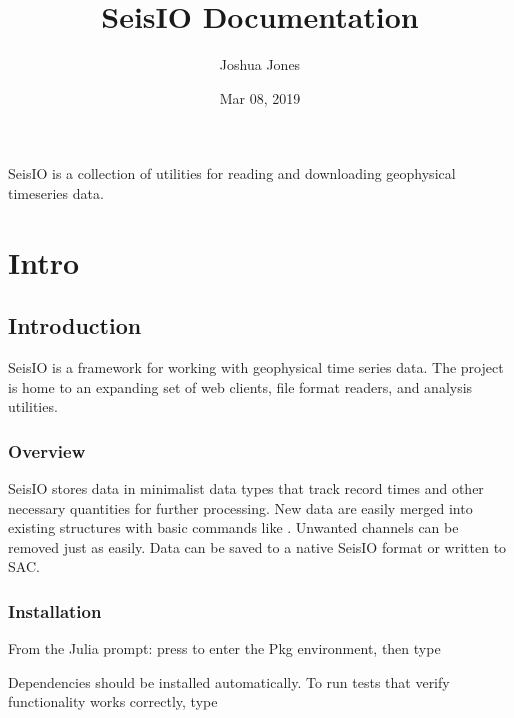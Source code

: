 \documentclass[letterpaper,11pt,english]{sphinxmanual}
\title{SeisIO Documentation}
\date{Mar 08, 2019}
\author{Joshua Jones}
\begin{document}
\pagestyle{empty}
\sphinxmaketitle
\pagestyle{plain}
\sphinxtableofcontents
\pagestyle{normal}
\label{\detokenize{index::doc}}


SeisIO is a collection of utilities for reading and downloading geophysical timeseries data.


\chapter{Intro}
\label{\detokenize{index:intro}}

\section{Introduction}
\label{\detokenize{src/intro:introduction}}\label{\detokenize{src/intro::doc}}
SeisIO is a framework for working with geophysical time series data. The project is home to an expanding set of web clients, file format readers, and analysis utilities.


\subsection{Overview}
\label{\detokenize{src/intro:overview}}
SeisIO stores data in minimalist data types that track record times and other necessary quantities for further processing. New data are easily merged into existing structures with basic commands like \sphinxcode{\sphinxupquote{+}}. Unwanted channels can be removed just as easily. Data can be saved to a native SeisIO format or written to SAC.


\subsection{Installation}
\label{\detokenize{src/intro:installation}}
From the Julia prompt: press \sphinxcode{\sphinxupquote{{]}}} to enter the Pkg environment, then type

\begin{sphinxVerbatim}[commandchars=\\\{\}]
   
\end{sphinxVerbatim}

Dependencies should be installed automatically. To run tests that verify functionality works correctly, type
\end{document}
